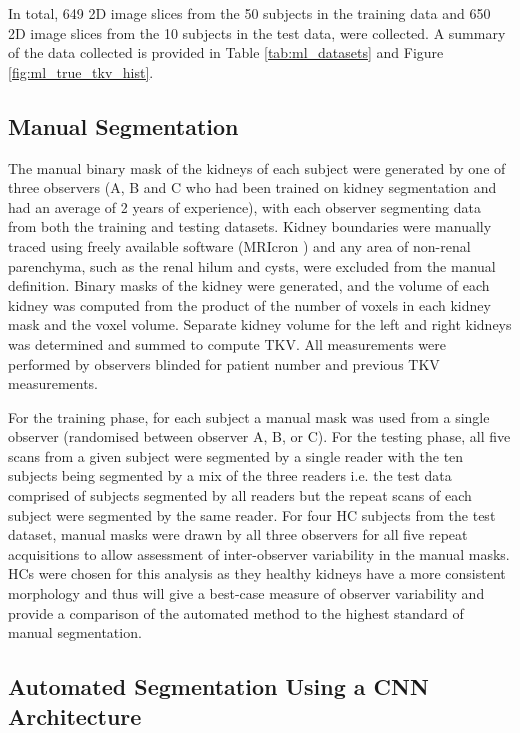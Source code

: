 In total, 649 2D image slices from the 50 subjects in the training data and 650 2D image slices from the 10 subjects in the test data, were collected. A summary of the data collected is provided in Table \ref{tab:ml_datasets} and Figure \ref{fig:ml_true_tkv_hist}.

\subsection{Manual Segmentation}
The manual binary mask of the kidneys of each subject were generated by one of three observers (A, B and C who had been trained on kidney segmentation and had an average of 2 years of experience), with each observer segmenting data from both the training and testing datasets. Kidney boundaries were manually traced using freely available software (MRIcron \cite{rorden_neurolabuscmricron_2021}) and any area of non-renal parenchyma, such as the renal hilum and cysts, were excluded from the manual definition. Binary masks of the kidney were generated, and the volume of each kidney was computed from the product of the number of voxels in each kidney mask and the voxel volume. Separate kidney volume for the left and right kidneys was determined and summed to compute \ac{TKV}. All measurements were performed by observers blinded for patient number and previous \ac{TKV} measurements. 

For the training phase, for each subject a manual mask was used from a single observer (randomised between observer A, B, or C). For the testing phase, all five scans from a given subject were segmented by a single reader with the ten subjects being segmented by a mix of the three readers i.e. the test data comprised of subjects segmented by all readers but the repeat scans of each subject were segmented by the same reader. For four \ac{HC} subjects from the test dataset, manual masks were drawn by all three observers for all five repeat acquisitions to allow assessment of inter-observer variability in the manual masks. \ac{HC}s were chosen for this analysis as they healthy kidneys have a more consistent morphology and thus will give a best-case measure of observer variability and provide a comparison of the automated method to the highest standard of manual segmentation.

\subsection{Automated Segmentation Using a CNN Architecture}

